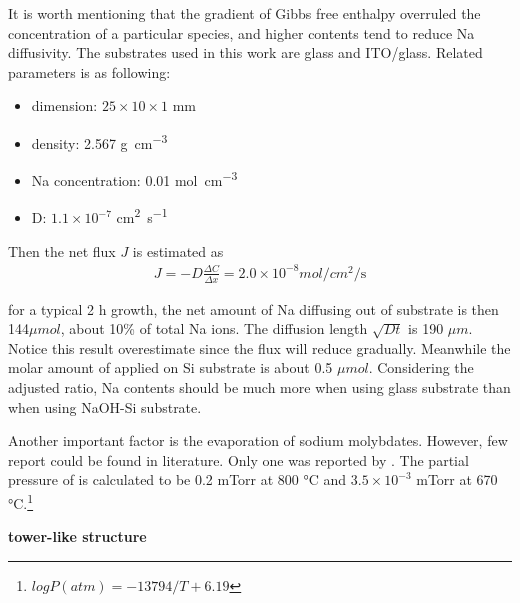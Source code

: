 It is worth mentioning that the gradient of Gibbs free enthalpy overruled the concentration of a particular species, and higher  contents tend to reduce Na diffusivity.\cite{Materials2012}  The substrates used in this work are glass and ITO/glass. Related parameters is as following:
\begin{itemize}
\item dimension: $25\times10\times1$ mm
\item density: 2.567 \si{g\per cm^3}
\item Na concentration: 0.01 \si{mol\per cm^3}
\item D: $1.1\times10^{-7}$ \si{cm^2\per\second}
\end{itemize}

Then the net flux $J$ is estimated as
\begin{align}
J = -D \frac{\Delta C}{\Delta x} = 2.0\times 10^{-8} \si{mol\per cm^2\per\second}
\end{align}

for a typical 2 h growth, the net amount of Na diffusing out of substrate is then 144$\mu mol$, about 10\% of total Na ions. The diffusion length $\sqrt{Dt}$ is 190 $\mu m$. Notice this result overestimate since the flux will reduce gradually. Meanwhile the molar amount of  applied on Si substrate is about 0.5 $\mu mol$. Considering the adjusted ratio, Na contents should be much more when using glass substrate than when using NaOH-Si substrate.

Another important factor is the evaporation of sodium molybdates. However, few report could be found in literature. Only one was reported by \citeauthor{Kazenas2010}.\cite{Kazenas2010} The partial pressure of  is calculated to be 0.2 mTorr at 800 \si{\degreeCelsius} and $3.5\times 10^{-3}$ mTorr at 670 \si{\degreeCelsius}.\footnote{$logP(atm)= -13794/T + 6.19$} 

\textbf{tower-like structure}

